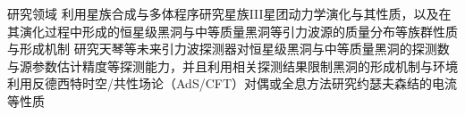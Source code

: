 
\begin{rubric}{研究领域}
	\entry*[天体物理]
	利用星族合成与多体程序研究星族III星团动力学演化与其性质，以及在其演化过程中形成的恒星级黑洞与中等质量黑洞等引力波源的质量分布等族群性质与形成机制
	\entry*[天体物理]
	研究天琴等未来引力波探测器对恒星级黑洞与中等质量黑洞的探测数与源参数估计精度等探测能力，并且利用相关探测结果限制黑洞的形成机制与环境
	\entry*[理论物理]
	利用反德西特时空/共性场论（AdS/CFT）对偶或全息方法研究约瑟夫森结的电流等性质
\end{rubric}
